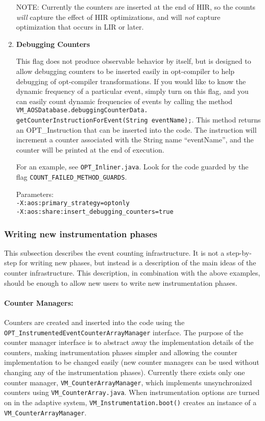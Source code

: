 \begin{enumerate}
NOTE: Currently the counters are inserted at the end of HIR, so the
counts {\em will} capture the effect of HIR optimizations, and will
{\em not} capture optimization that occurs in LIR or later.  

\item {\bf Debugging Counters}  

This flag does not produce observable behavior by itself, but is
designed to allow debugging counters to be inserted easily in
opt-compiler to help debugging of opt-compiler transformations.
If you would like to know the dynamic frequency of a particular
event, simply turn on this flag, and you can easily count dynamic
frequencies of events by calling the method
 {\tt VM\_AOSDatabase.debuggingCounterData.
getCounterInstructionForEvent(String eventName);}.  This method
returns an OPT\_Instruction that can be inserted into the
code.  The instruction will increment a counter associated with
the String name ``eventName'', and the counter will be printed at the
end of execution.

For an example, see {\tt OPT\_Inliner.java}.  Look
for the code guarded by the flag {\tt COUNT\_FAILED\_METHOD\_GUARDS}.
 
Parameters:\\
{\tt -X:aos:primary\_strategy=optonly \\
-X:aos:share:insert\_debugging\_counters=true}

\end{enumerate}

\subsubsection{Writing new instrumentation phases}
\label{adding_phases}
This subsection describes the event counting infrastructure.  It is
not a step-by-step for writing new phases, but instead is a
description of the main ideas of the counter infrastructure.
This description, in combination with the above examples, should be
enough to allow new users to write new instrumentation phases.

\paragraph{Counter Managers:}  Counters are created and inserted into
the code using the {\tt OPT\_InstrumentedEventCounterArrayManager} interface.
The purpose of the counter manager interface is to abstract away the
implementation details of the counters, making instrumentation
phases simpler and allowing the counter implementation to be changed
easily (new counter managers can be used without changing any of the
instrumentation phases).  Currently there exists only one counter
manager, {\tt VM\_CounterArrayManager}, which implements unsynchronized
counters using {\tt VM\_CounterArray.java}.  When instrumentation options
are turned on in the adaptive system, {\tt VM\_Instrumentation.boot()}
creates an instance of a {\tt VM\_CounterArrayManager}.

